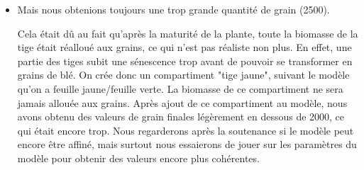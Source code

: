 \begin{itemize}
	\item Mais nous obtenions toujours une trop grande quantité de grain (2500). 

Cela était dû au fait qu'après la maturité de la plante, toute la biomasse de la tige était réalloué aux grains, ce qui n'est pas réaliste non plus. En effet, une partie des tiges subit une sénescence trop avant de pouvoir se transformer en grains de blé. On crée donc un compartiment "tige jaune", suivant le modèle qu'on a feuille jaune/feuille verte. La biomasse de ce compartiment ne sera jamais allouée aux grains.
Après ajout de ce compartiment au modèle, nous avons obtenu des valeurs de grain finales légèrement en dessous de 2000, ce qui était encore trop. 
Nous regarderons après la soutenance si le modèle peut encore être affiné, mais surtout nous essaierons de jouer sur les paramètres du modèle pour obtenir des valeurs encore plus cohérentes.


\end{itemize}

 
 







